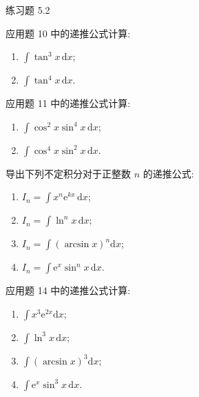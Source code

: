 \begin{exblock}{练习题 5.2}
  \item 应用题 10 中的递推公式计算:
  \begin{enumerate}[label=(\arabic*)]
    \item $\int\tan^{3}x\,\mathrm{d}x$;
    \item $\int\tan^{4}x\,\mathrm{d}x$.
  \end{enumerate}

  \item 应用题 11 中的递推公式计算:
  \begin{enumerate}[label=(\arabic*)]
    \item $\int\cos^{2}x\sin^{4}x\,\mathrm{d}x$;
    \item $\int\cos^{4}x\sin^{2}x\,\mathrm{d}x$.
  \end{enumerate}

  \item 导出下列不定积分对于正整数 $n$ 的递推公式:
  \begin{enumerate}[label=(\arabic*)]
    \item $I_{n}=\int x^{n}\mathrm{e}^{kx}\,\mathrm{d}x$;
    \item $I_{n}=\int\ln^{n}x\,\mathrm{d}x$;
    \item $I_{n}=\int(\arcsin x)^{n}\mathrm{d}x$;
    \item $I_{n}=\int\mathrm{e}^{x}\sin^{n}x\,\mathrm{d}x$.
  \end{enumerate}

  \item 应用题 14 中的递推公式计算:
  \begin{enumerate}[label=(\arabic*)]
    \item $\int x^{3}\mathrm{e}^{2x}\mathrm{d}x$;
    \item $\int\ln^{3}x\,\mathrm{d}x$;
    \item $\int(\arcsin x)^{3}\mathrm{d}x$;
    \item $\int\mathrm{e}^{x}\sin^{3}x\,\mathrm{d}x$.
  \end{enumerate}
\end{exblock}
